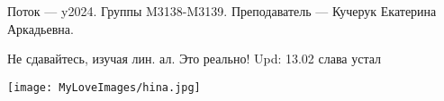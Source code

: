 Поток — y2024.\newline
Группы M3138-M3139.\newline
Преподаватель --- Кучерук Екатерина Аркадьевна.\par

Не сдавайтесь, изучая лин. ал. Это реально!
Upd: 13.02 слава устал
\begin{center}
   \texttt{[image: MyLoveImages/hina.jpg]}
\end{center}